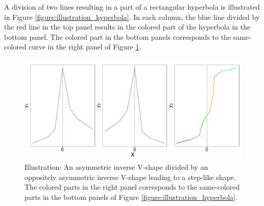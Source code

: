 \documentclass[11pt, a4paper]{article}
\begin{document}


\noindent
A division of two lines resulting in a part of a rectangular hyperbola is illustrated in Figure \ref{figure:illustration_hyperbola}. In each column, the blue line divided by the red line in the top panel results in the colored part of the hyperbola in the bottom panel. The colored part in the bottom panels corresponds to the same-colored curve in the right panel of Figure \ref{figure:illustration_color}.

\begin{figure}[H]
	\centering
	\includegraphics[width=0.9\columnwidth]{illustration_color.pdf}
	\caption{\small Illustration: An asymmetric inverse V-shape divided by an oppositely asymmetric inverse V-shape leading to a step-like shape. The colored parts in the right panel corresponds to the same-colored parts in the bottom panels of Figure \ref{figure:illustration_hyperbola}.}
	\label{figure:illustration_color}
\end{figure}
\end{document}
